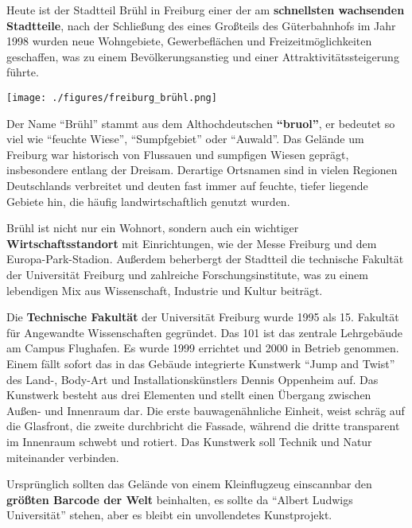 \documentclass[landscape, a4paper]{article}
\newcommand\alert[1]{\textcolor{PrimaryColor}{\textbf{#1}}}
\begin{document}
\newpage%
\noindent%
\begin{minipage}[t]{0.31\textwidth}
	\vspace{0cm}
	\setlength{\parskip}{0.25cm}

	Heute ist der Stadtteil Brühl in Freiburg einer der am \alert{schnellsten wachsenden Stadtteile}, nach der Schließung des eines Großteils des Güterbahnhofs im Jahr 1998 wurden neue Wohngebiete, Gewerbeflächen und Freizeitmöglichkeiten geschaffen, was zu einem Bevölkerungsanstieg und einer Attraktivitätssteigerung führte.

	\texttt{[image: ./figures/freiburg\_brühl.png]}
	\setlength{\parskip}{0.25cm}

	Der Name \enquote{Brühl} stammt aus dem Althochdeutschen \alert{\enquote{bruol}}, er bedeutet so viel wie \enquote{feuchte Wiese}, \enquote{Sumpfgebiet} oder \enquote{Auwald}. Das Gelände um Freiburg war historisch von Flussauen und sumpfigen Wiesen geprägt, insbesondere entlang der Dreisam. Derartige Ortsnamen sind in vielen Regionen Deutschlands verbreitet und deuten fast immer auf feuchte, tiefer liegende Gebiete hin, die häufig landwirtschaftlich genutzt wurden.

	Brühl ist nicht nur ein Wohnort, sondern auch ein wichtiger \alert{Wirtschaftsstandort} mit Einrichtungen, wie der Messe Freiburg und dem Europa-Park-Stadion. Außerdem beherbergt der Stadtteil die technische Fakultät der Universität Freiburg und zahlreiche Forschungsinstitute, was zu einem lebendigen Mix aus Wissenschaft, Industrie und Kultur beiträgt.

  Die \alert{Technische Fakultät} der Universität Freiburg wurde 1995 als 15. Fakultät für Angewandte Wissenschaften gegründet. Das 101 ist das zentrale Lehrgebäude am Campus Flughafen. Es wurde 1999 errichtet und 2000 in Betrieb genommen. Einem fällt sofort das in das Gebäude integrierte Kunstwerk \enquote{Jump and Twist} des Land-, Body-Art und Installationskünstlers Dennis Oppenheim auf. Das Kunstwerk besteht aus drei Elementen und stellt einen Übergang zwischen Außen- und Innenraum dar. Die erste bauwagenähnliche Einheit, weist schräg auf die Glasfront, die zweite durchbricht die Fassade, während die dritte transparent im Innenraum schwebt und rotiert. Das Kunstwerk soll Technik und Natur miteinander verbinden.

  Ursprünglich sollten das Gelände von einem Kleinflugzeug einscannbar den \alert{größten Barcode der Welt} beinhalten, es sollte da \enquote{Albert Ludwigs Universität} stehen, aber es bleibt ein unvollendetes Kunstprojekt.
\end{minipage}%
\end{document}
